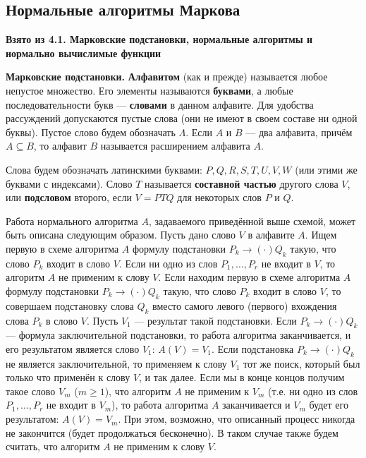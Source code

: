 \documentclass[a4paper,12pt]{article}
\begin{document}
\subsection{Нормальные алгоритмы Маркова}

\textbf{Взято из 4.1. Марковские подстановки, нормальные алгоритмы и нормально вычислимые функции}

\textbf{Марковские подстановки.} \textbf{Алфавитом} (как и прежде) называется любое непустое множество. Его элементы называются \textbf{буквами}, а любые последовательности букв --- \textbf{словами} в данном алфавите. Для удобства рассуждений допускаются пустые слова (они не имеют в своем составе ни одной буквы). Пустое слово будем обозначать \(\Lambda\). Если \(A\) и \(B\) --- два алфавита, причём \(A \subseteq B\), то алфавит \(B\) называется расширением алфавита \(A\).

Слова будем обозначать латинскими буквами: \(P, Q, R, S, T, U, V, W\) (или этими же буквами с индексами). Слово \(T\) называется \textbf{составной частью} другого слова \(V\), или \textbf{подсловом} второго, если \(V = P T Q\) для некоторых слов \(P\) и \(Q\).

Работа нормального алгоритма \(A\), задаваемого приведённой выше схемой, может быть описана следующим образом. Пусть дано слово \(V\) в алфавите \(A\). Ищем первую в схеме алгоритма \(A\) формулу подстановки \(P_k \to (\cdot) Q_k\) такую, что слово \(P_k\) входит в слово \(V\). Если ни одно из слов \(P_1, \dots, P_r\) не входит в \(V\), то алгоритм \(A\) не применим к слову \(V\). Если находим первую в схеме алгоритма \(A\) формулу подстановки \(P_k \to (\cdot) Q_k\) такую, что слово \(P_k\) входит в слово \(V\), то совершаем подстановку слова \(Q_k\) вместо самого левого (первого) вхождения слова \(P_k\) в слово \(V\). Пусть \(V_1\) --- результат такой подстановки. Если \(P_k \to (\cdot) Q_k\) --- формула заключительной подстановки, то работа алгоритма заканчивается, и его результатом является слово \(V_1\): \(A(V) = V_1\). Если подстановка \(P_k \to (\cdot) Q_k\) не является заключительной, то применяем к слову \(V_1\) тот же поиск, который был только что применён к слову \(V\), и так далее. Если мы в конце концов получим такое слово \(V_m\) (\(m \ge 1\)), что алгоритм \(A\) не применим к \(V_m\) (т.е. ни одно из слов \(P_1, \dots, P_r\) не входит в \(V_m\)), то работа алгоритма \(A\) заканчивается и \(V_m\) будет его результатом: \(A(V) = V_m\). При этом, возможно, что описанный процесс никогда не закончится (будет продолжаться бесконечно). В таком случае также будем считать, что алгоритм \(A\) не применим к слову \(V\).
\end{document}
